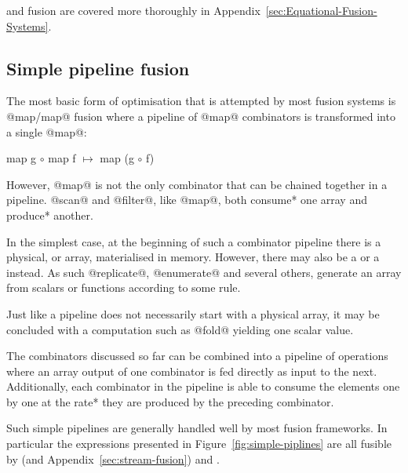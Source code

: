 \documentclass[preamble.tex]{subfiles}
\begin{document}
\StreamFusion and  fusion are covered more thoroughly in Appendix~\ref{sec:Equational-Fusion-Systems}.



\subsection{Simple pipeline fusion}
\label{sec:straight-line}

The most basic form of optimisation that is attempted by most fusion systems is @map/map@ fusion where a pipeline of @map@ combinators is transformed into a single @map@:

\begin{hscode}[mathescape]
map g $\circ$ map f $\mapsto$ map (g $\circ$ f)
\end{hscode}

However, @map@ is not the only combinator that can be chained together in a pipeline. @scan@ and @filter@, like @map@, both \*consume* one array and \*produce* another.

In the simplest case, at the beginning of such a combinator pipeline there is a physical, or \imanifest array, materialised in memory. However, there may also be a  or a \igencomb instead. As such @replicate@, @enumerate@ and several others, generate an array from scalars or functions according to some rule.

Just like a pipeline does not necessarily start with a physical array, it may be concluded with a computation such as @fold@ yielding one scalar value.

The combinators discussed so far can be combined into a pipeline of operations where an array output of one combinator is fed directly as input to the next. Additionally, each combinator in the pipeline is able to consume the elements one by one at the \*rate* they are produced by the preceding combinator.


Such simple pipelines are generally handled well by most fusion frameworks. In particular the expressions presented in Figure~\ref{fig:simple-piplines} are all fusible by  \cite{CLS07} (and Appendix~\ref{sec:stream-fusion}) and  \cite{CK01}.
\end{document}
